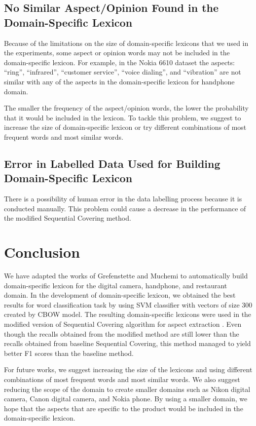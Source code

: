 \documentclass[a4paper,conference]{IEEEtran}
\begin{document}
\subsection{No Similar Aspect/Opinion Found in the Domain-Specific Lexicon}
Because of the limitations on the size of domain-specific lexicons that we used in the experiments, some aspect or opinion words may not be included in the domain-specific lexicon. For example, in the Nokia 6610 dataset the aspects: “ring”, “infrared”, “customer service”, “voice dialing”, and “vibration” are not similar with any of the aspects in the domain-specific lexicon for handphone domain.

The smaller the frequency of the aspect/opinion words, the lower the probability that it would be included in the lexicon. To tackle this problem, we suggest to increase the size of domain-specific lexicon or try different combinations of most frequent words and most similar words.

\subsection{Error in Labelled Data Used for Building Domain-Specific Lexicon}
There is a possibility of human error in the data labelling process because it is conducted manually. This problem could cause a decrease in the performance of the modified Sequential Covering method.


\section{Conclusion}
We have adapted the works of Grefenstette and Muchemi \cite{b9} to automatically build domain-specific lexicon for the digital camera, handphone, and restaurant domain. In the development of domain-specific lexicon, we obtained the best results for word classification task by using SVM classifier with vectors of size 300 created by CBOW model. The resulting domain-specific lexicons were used in the modified version of Sequential Covering algorithm for aspect extraction \cite{b2}. Even though the recalls obtained from the modified method are still lower than the recalls obtained from baseline Sequential Covering, this method managed to yield better F1 scores than the baseline method.

For future works, we suggest increasing the size of the lexicons and using different combinations of most frequent words and most similar words. We also suggest reducing the scope of the domain to create smaller domains such as Nikon digital camera, Canon digital camera, and Nokia phone. By using a smaller domain, we hope that the aspects that are specific to the product would be included in the domain-specific lexicon.
\end{document}
